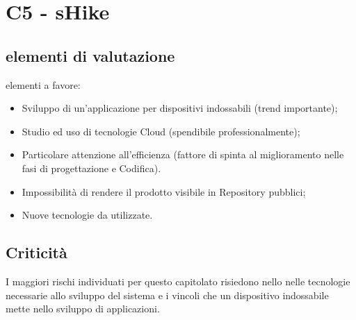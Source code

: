 \section{C5 - sHike}{
	\subsection{elementi di valutazione}{
		elementi a favore:
		\begin{itemize}
			\item Sviluppo di un'applicazione per dispositivi indossabili (trend importante);
			\item Studio ed uso di tecnologie Cloud (spendibile professionalmente);
			\item Particolare attenzione all'efficienza (fattore di spinta al miglioramento nelle fasi di progettazione e Codifica).
		\end{itemize}
		
		\begin{itemize}
			\item Impossibilità di rendere il prodotto visibile in Repository pubblici;
			\item Nuove tecnologie da utilizzate.
		\end{itemize}
	}
	\subsection{Criticità}{
		I maggiori rischi individuati per questo capitolato risiedono nello nelle tecnologie necessarie allo sviluppo del sistema e i vincoli che un dispositivo indossabile mette nello sviluppo di applicazioni. 
	}
}